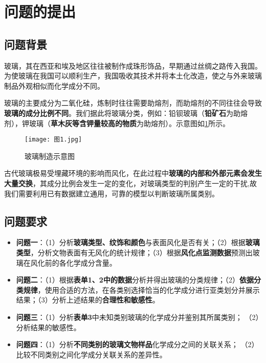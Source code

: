 \documentclass{MathModeling}
\begin{document}
	\section{问题的提出}
	\subsection{问题背景}
	玻璃，其在西亚和埃及地区往往被制作成珠形饰品，早期通过丝绸之路传入我国。为使玻璃在我国可以顺利生产，我国吸收其技术并将本土化改造，使之与外来玻璃制品外观相似而化学成分不同。
	
	玻璃的主要成分为二氧化硅，炼制时往往需要助熔剂，而助熔剂的不同往往会导致{\textbf{玻璃的成分比例不同}}。我们据此将玻璃分类，例如：铅钡玻璃（{\textbf{铅矿石}}为助熔剂），钾玻璃（{\textbf{草木灰等含钾量较高的物质}}为助熔剂）。示意图如\textcolor{blue}{\cref{玻璃制造示意}}所示。
	
	\begin{figure}[H]
		\centering
\texttt{[image: 图1.jpg]}
		\caption{玻璃制造示意图}
		\label{玻璃制造示意}
	\end{figure}

	古代玻璃极易受埋藏环境的影响而风化，在此过程中{\textbf{玻璃的内部和外部元素会发生大量交换}}，其成分比例会发生一定的变化，对玻璃类型的判别产生一定的干扰,故我们需要利用已有数据建立通用，可靠的模型以判断玻璃所属类别。

	
	\subsection{问题要求}
	\begin{itemize}
		\item \textbf{问题一}：（1）分析{\textbf{玻璃类型、纹饰和颜色}}与表面风化是否有关；（2）根据{\textbf{玻璃类型}}，分析文物表面有无风化的统计规律；（3）根据{\textbf{风化点监测数据}}预测出玻璃在风化前的各化学成分含量。
		\item \textbf{问题二}：（1）根据{\textbf{表单1、2中的数据}}分析并得出玻璃的分类规律；（2）{\textbf{依据分类规律}}，使用合适的方法，在各类别选择恰当的化学成分进行亚类划分并展示结果；（3）分析上述结果的{\textbf{合理性和敏感性}}。
		\item \textbf{问题三}：（1）分析{\textbf{表单3}}中未知类别玻璃的化学成分并鉴别其所属类别； （2）分析结果的敏感性。
		\item \textbf{问题四}：（1）分析{\textbf{不同类别的玻璃文物样品}}化学成分之间的关联关系； （2）比较不同类别之间化学成分关联关系的差异性。
	\end{itemize}
\end{document}
